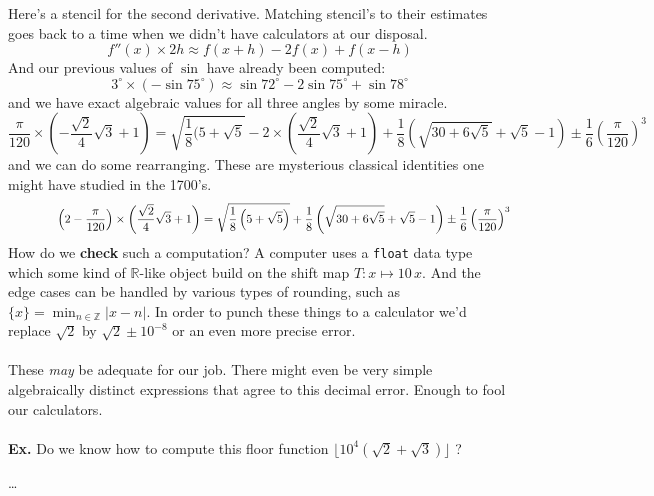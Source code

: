 \documentclass[12pt]{article}
\begin{document}
\newpage

\noindent Here's a stencil for the second derivative.  Matching stencil's to their estimates goes back to a time when we didn't have calculators at our disposal.
$$ f''(x) \times 2h \approx f(x+h) - 2f(x) + f(x-h) $$
And our previous values of $\sin$ have already been computed:
$$ 3^\circ \times (-\sin 75^\circ) \approx 
\sin 72^\circ - 2 \sin 75^\circ + \sin 78^\circ $$
and we have exact algebraic values for all three angles by some miracle.
$$ \frac{\pi}{120} \times (-\frac{\sqrt{2}}{4} \sqrt{3}+ 1)= \sqrt{\frac{1}{8}(5 + \sqrt{5}} - 2 \times (\frac{\sqrt{2}}{4}\sqrt{3}+1) + \frac{1}{8}(\sqrt{30 + 6 \sqrt{5}} + \sqrt{5}-1) \pm \frac{1}{6} \left(\frac{\pi}{120}\right)^3 $$
and we can do some rearranging.  These are mysterious classical identities one might have studied in the 1700's.
$$ \hspace{0.555in} \left( 2 - \frac{\pi}{120}\right) \times \left( \frac{\sqrt{2}}{4} \sqrt{3} + 1 \right) = 
\sqrt{\frac{1}{8} \left( 5 + \sqrt{5} \right)} + \frac{1}{8} \left( \sqrt{30 + 6 \sqrt{5}} + \sqrt{5}-1 \right)\pm \frac{1}{6} \left(\frac{\pi}{120}\right)^3   $$
How do we \textbf{check} such a computation?  A computer uses a \texttt{float} data type which some kind of $\mathbb{R}$-like object build on the shift map $T: x \mapsto 10 \, x$.  And the edge cases can be handled by various types of rounding, such as $\displaystyle \{ x \} = \min_{n \in \mathbb{Z}}|x - n|$.  In order to punch these things to a calculator we'd replace $\sqrt{2}$ by $\sqrt{2} \pm 10^{-8}$ or an even more precise error. \\ \\
These \textit{may} be adequate for our job. There might even be very simple algebraically distinct expressions that agree to this decimal error.  Enough to fool our calculators. \\ \\
\textbf{Ex.} Do we know how to compute this floor function $\lfloor 10^4 (\sqrt{2} + \sqrt{3})\rfloor$ ?

\vfill
\begin{thebibliography}{}

\item \dots

\end{thebibliography}
\end{document}
